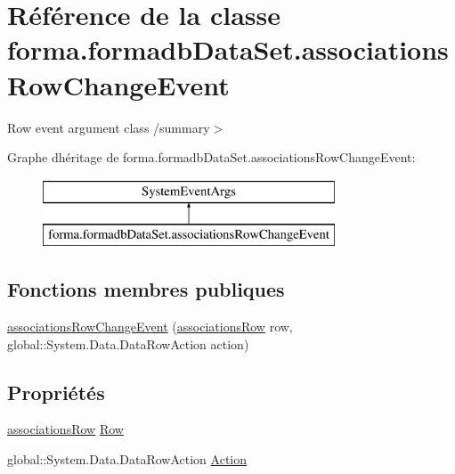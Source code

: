 \hypertarget{classforma_1_1formadb_data_set_1_1associations_row_change_event}{}\section{Référence de la classe forma.\+formadb\+Data\+Set.\+associations\+Row\+Change\+Event}
\label{classforma_1_1formadb_data_set_1_1associations_row_change_event}


Row event argument class /summary$>$  


Graphe d\textquotesingle{}héritage de forma.\+formadb\+Data\+Set.\+associations\+Row\+Change\+Event\+:\begin{figure}[H]
\begin{center}
\leavevmode
\includegraphics[height=2.000000cm]{classforma_1_1formadb_data_set_1_1associations_row_change_event}
\end{center}
\end{figure}
\subsection*{Fonctions membres publiques}
\begin{DoxyCompactItemize}
\item 
\hyperlink{classforma_1_1formadb_data_set_1_1associations_row_change_event_a6c8c56f776688a7695e26c95a5b29155}{associations\+Row\+Change\+Event} (\hyperlink{classforma_1_1formadb_data_set_1_1associations_row}{associations\+Row} row, global\+::\+System.\+Data.\+Data\+Row\+Action action)
\end{DoxyCompactItemize}
\subsection*{Propriétés}
\begin{DoxyCompactItemize}
\item 
\hyperlink{classforma_1_1formadb_data_set_1_1associations_row}{associations\+Row} \hyperlink{classforma_1_1formadb_data_set_1_1associations_row_change_event_af13f50b313d854497aa0667c9696154a}{Row}
\item 
global\+::\+System.\+Data.\+Data\+Row\+Action \hyperlink{classforma_1_1formadb_data_set_1_1associations_row_change_event_a7429bb8842f94cad23aa649ba9eeafed}{Action}
\end{DoxyCompactItemize}


